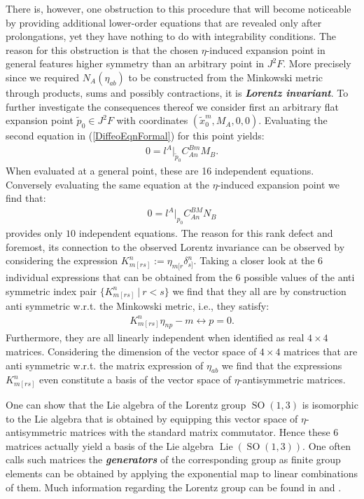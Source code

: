 There is, however, one obstruction to this procedure that will become noticeable by providing additional lower-order equations that are revealed only after prolongations, yet they have nothing to do with integrability conditions. 
The reason for this obstruction is that the chosen $\eta$-induced expansion point in general features higher symmetry than an arbitrary point in $J^2F$. More precisely since we required $N_A(\eta_{ab})$ to be constructed from the Minkowski metric through products, sums and possibly contractions, it is \textit{\textbf{Lorentz invariant}}. To further investigate the consequences thereof we consider first an arbitrary flat expansion point $\tilde{p}_0 \in J^2F$ with coordinates $(\tilde{x}_0^m,M_A,0,0)$. Evaluating the second equation in (\ref{DiffeoEqnFormal}) for this point yields:
\begin{align}
    0 = l^A \vert _{\tilde{p}_0} C^{Bm}_{An}M_B.
\end{align}
When evaluated at a general point, these are 16 independent equations. 
Conversely evaluating the same equation at the $\eta$-induced expansion point we find that:
\begin{align}\label{RankDef}
    0 = l^A \vert_{p_0} C^{BM}_{An}N_B
\end{align}
provides only $10$ independent equations. The reason for this rank defect and foremost, its connection to the observed Lorentz invariance can be observed by considering the expression $K_{m[rs]}^n :=\eta_{m[r}\delta_{s]}^n$. 
Taking a closer look at the $6$ individual expressions that can be obtained from the $6$ possible values of the anti symmetric index pair  $\{K_{m[rs]}^n \ \vert \ r < s \} $ we find that they all are by construction anti symmetric w.r.t. the Minkowski metric, i.e., they satisfy: 
\begin{align}
K_{m[rs]}^n\eta_{n p} - m \leftrightarrow p = 0.
\end{align}
Furthermore, they are all linearly independent when identified as real $4 \times 4$ matrices. Considering the dimension of the vector space of $4 \times 4$ matrices that are anti symmetric w.r.t. the matrix expression of $\eta_{ab}$ we find that  the expressions $K_{m[rs]}^n$ even constitute a basis of the vector space of $\eta$-antisymmetric matrices. 

One can show that the Lie algebra of the Lorentz group $\operatorname{SO}(1,3)$ is isomorphic to the Lie algebra that is obtained by equipping this vector space of $\eta$-antisymmetric matrices with the standard matrix commutator. Hence these $6$ matrices actually yield a basis of the Lie algebra $\operatorname{Lie}(\operatorname{SO}(1,3))$. One often calls such matrices the \textit{\textbf{generators}} of the corresponding group as finite group elements can be obtained by applying the exponential map to linear combinations of them. Much information regarding the Lorentz group can be found in \cite{doi:10.1142/p199} and \cite{naimark2014linear}.

